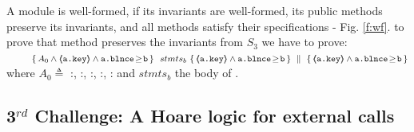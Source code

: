 A module is well-formed, if  its invariants are well-formed,    its public methods preserve   its invariants, and  all  methods satisfy their specifications - \cf  Fig.  \ref{f:wf}.
%
%
%
%
%
%
%
%
\Eg to prove  that method  preserves the invariants from {$S_3$}  we  have to prove:
\\
{ \footnotesize{
$\strut \ \ \ \ \ \   \ \   \quadruple {A_0  \wedge  \inside{\prg{a.\password}} \wedge  \prg{a.\balance}\!\geq\!{\prg{b}} } {\  stmts_{b}  \  } {\inside{\prg{a.\password}} \wedge  \prg{a.\balance}\!\geq\!{\prg{b}}}  
   { \inside{\prg{a.\password}}\wedge  \prg{a.\balance}\!\geq\!{\prg{b} }}$
}}
\\
where $A_0 \triangleq $  {\footnotesize{
:, :, :, :$
$, :}} and $stmts_{b}$ %
the    body of .
 


 
 \vspace{.1cm}
 
   \subsection{3$^{rd}$ Challenge:  A Hoare logic for external calls}  
 \label{sec:howThird}
 
